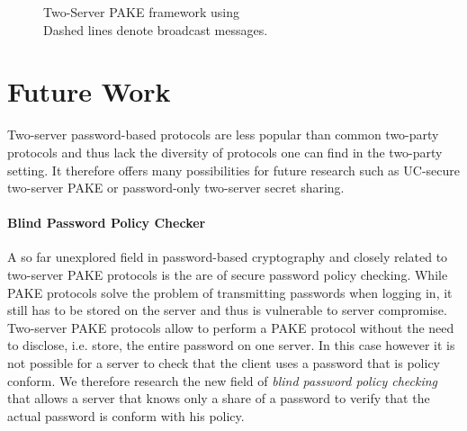 \begin{sidewaysfigure}[htbp]
\caption[Two-Server PAKE framework using \SPHFF]{Two-Server PAKE framework using \SPHFF
\\{\tiny Dashed lines denote broadcast messages.}}
\label{fig:twopake}
\end{sidewaysfigure}

\section{Future Work}
Two-server password-based protocols are less popular than common two-party protocols and thus lack the diversity of protocols one can find in the two-party setting.
It therefore offers many possibilities for future research such as \ac{UC}-secure two-server \ac{PAKE} or password-only two-server secret sharing.

\paragraph{Blind Password Policy Checker} \label{sec:policies}
A so far unexplored field in password-based cryptography and closely related to two-server \ac{PAKE} protocols is the are of secure password policy checking.
While \ac{PAKE} protocols solve the problem of transmitting passwords when logging in, it still has to be stored on the server and thus is vulnerable to server compromise.
Two-server \ac{PAKE} protocols allow to perform a \ac{PAKE} protocol without the need to disclose, i.e. store, the entire password on one server.
In this case however it is not possible for a server to check that the client uses a password that is policy conform.
We therefore research the new field of \emph{blind password policy checking} that allows a server that knows only a share of a password to verify that the actual password is conform with his policy.


